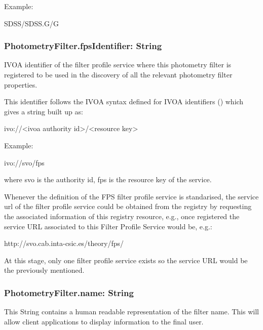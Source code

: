 \documentclass[11pt,a4paper]{ivoa}
\begin{document}
Example:
\par
SDSS/SDSS.G/G
\bigskip


\subsubsection{PhotometryFilter.fpsIdentifier: String}
IVOA identifier of the filter profile service where this photometry 
filter is registered to be used in the discovery of all the relevant 
photometry filter properties.
\par

This identifier follows the IVOA syntax defined for IVOA 
identifiers (\citep{plante}) which gives a string built up as:
\par

ivo://<ivoa authority id>/<resource key>
\bigskip




Example:
\par

ivo://svo/fps
\bigskip




where svo is the authority id, fps is the resource key of the service.
\par

Whenever the definition of the FPS filter profile service is standarised,
the service url of the filter profile service could be obtained 
from the registry by requesting the associated information of this 
registry resource, e.g., once registered the service URL associated 
to this Filter Profile Service would be, e.g.:
\par

http://svo.cab.inta-csic.es/theory/fps/
\bigskip

At this stage, only one filter profile service exists so the service
URL would be the previously mentioned.

\subsubsection{PhotometryFilter.name: String}
This String contains a human readable representation of the filter 
name. This will allow client applications to display information 
to the final user.
\par
\end{document}
